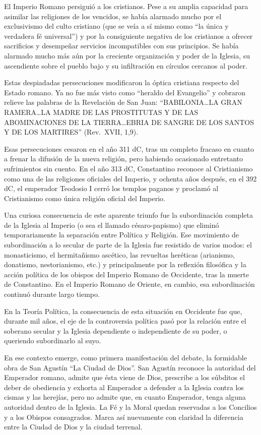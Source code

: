 \documentclass[
]{book}
\begin{document}
El Imperio Romano persiguió a los cristianos. Pese a su amplia capacidad para asimilar las religiones de los vencidos, se había alarmado mucho por el exclusivismo del culto cristiano (que se veía a sí mismo como ``la única y verdadera fé universal'') y por la consiguiente negativa de los cristianos a ofrecer sacrificios y desempeñar servicios incompatibles con sus principios. Se había alarmado mucho más aún por la creciente organización y poder de la Iglesia, su ascendiente sobre el pueblo bajo y su infiltración en círculos cercanos al poder.

Estas despiadadas persecuciones modificaron la óptica cristiana respecto del Estado romano. Ya no fue más visto como ``heraldo del Evangelio'' y cobraron relieve las palabras de la Revelación de San Juan: ``BABILONIA\ldots LA GRAN RAMERA\ldots LA MADRE DE LAS PROSTITUTAS Y DE LAS ABOMINACIONES DE LA TIERRA\ldots EBRIA DE SANGRE DE LOS SANTOS Y DE LOS MARTIRES'' (Rev.~XVII, 1,9).

Esas persecuciones cesaron en el año 311 dC, tras un completo fracaso en cuanto a frenar la difusión de la nueva religión, pero habiendo ocasionado entretanto sufrimientos sin cuento. En el año 313 dC, Constantino reconoce al Cristianismo como una de las religiones oficiales del Imperio, y ochenta años después, en el 392 dC, el emperador Teodosio I cerró los templos paganos y proclamó al Cristianismo como única religión oficial del Imperio.

Una curiosa consecuencia de este aparente triunfo fue la subordinación completa de la Iglesia al Imperio (o sea el llamado césaro-papismo) que eliminó temporariamente la separación entre Política y Religión. Ese movimiento de subordinación a lo secular de parte de la Iglesia fue resistido de varios modos: el monasticismo, el hermitañismo ascético, las revueltas heréticas (arianismo, donatismo, nestorianismo, etc.) y principalmente por la reflexión filosófica y la acción política de los obispos del Imperio Romano de Occidente, tras la muerte de Constantino. En el Imperio Romano de Oriente, en cambio, esa subordinación continuó durante largo tiempo.

En la Teoría Política, la consecuencia de esta situación en Occidente fue que, durante mil años, el eje de la controversia política pasó por la relación entre el soberano secular y la Iglesia dependiente o independiente de su poder, o queriendo subordinarlo al suyo.

En ese contexto emerge, como primera manifestación del debate, la formidable obra de San Agustín ``La Ciudad de Dios''. San Agustín reconoce la autoridad del Emperador romano, admite que ésta viene de Dios, prescribe a los súbditos el deber de obediencia y exhorta al Emperador a defender a la Iglesia contra los cismas y las herejías, pero no admite que, en cuanto Emperador, tenga alguna autoridad dentro de la Iglesia. La Fé y la Moral quedan reservadas a los Concilios y a los Obispos consagrados. Marca así nuevamente con claridad la diferencia entre la Ciudad de Dios y la ciudad terrenal.
\end{document}
